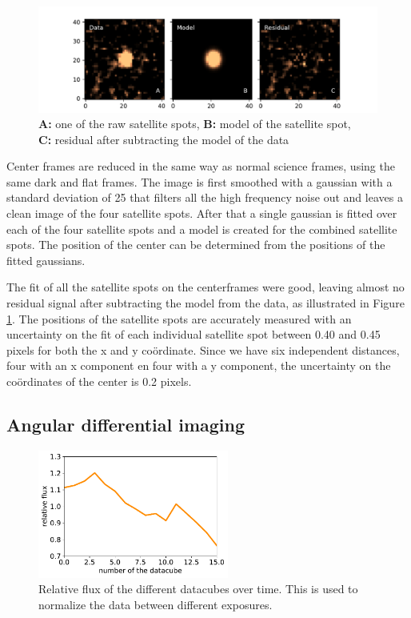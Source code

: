 \documentclass[twoside,single]{lion-msc}
\begin{document}
\begin{figure}[!b]
\centering 
\includegraphics[width = \textwidth]{resultmodel}
\caption{\textbf{A:} one of the raw satellite spots, \textbf{B:} model of the satellite spot,\\ \textbf{C:} residual after subtracting the model of the data} 
\label{fig:resultmodel}
\end{figure}
\bigskip
Center frames are reduced in the same way as normal science frames, using the same dark and flat frames. The image is first smoothed with a gaussian with a standard deviation of 25 that filters all the high frequency noise out and leaves a clean image of the four satellite spots. After that a single gaussian is fitted over each of the four satellite spots and a model is created for the combined satellite spots. The position of the center can be determined from the positions of the fitted gaussians. 
\bigskip

The fit of all the satellite spots on the centerframes were good, leaving almost no residual signal after subtracting the model from the data, as illustrated in Figure \ref{fig:resultmodel}. The positions of the satellite spots are accurately measured with an uncertainty on the fit of each individual satellite spot between 0.40 and 0.45 pixels for both the x and y co\"ordinate. Since we have six independent distances, four with an x component en four with a y component, the uncertainty on the co\"ordinates of the center is 0.2 pixels.

\subsection{Angular differential imaging}
\begin{figure}
\centering
\includegraphics[width = 0.56\textwidth]{aonorm}
\caption{Relative flux of the different datacubes over time. This is used to normalize the data between different exposures.}
\label{fig:aonorm}
\end{figure}
\end{document}
